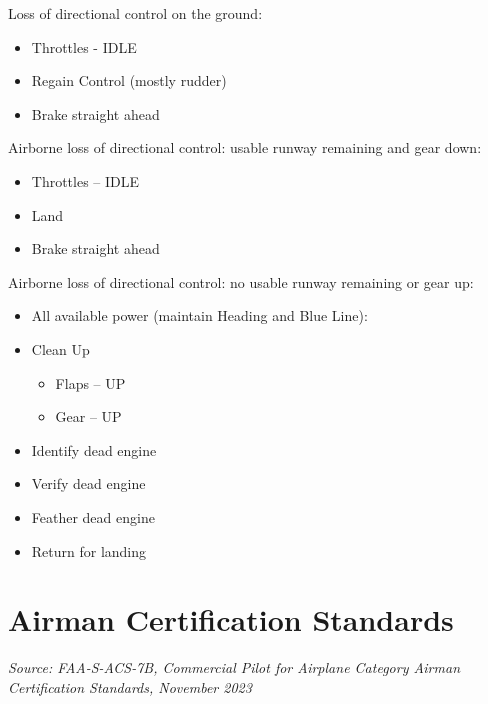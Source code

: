 \bfseries{

Loss of directional control on the ground:
\begin{itemize}
    \item Throttles - IDLE
    \item Regain Control (mostly rudder)
    \item Brake straight ahead
\end{itemize}

Airborne loss of directional control: usable runway remaining and gear down:
\begin{itemize}
    \item Throttles – IDLE
    \item Land
    \item Brake straight ahead
\end{itemize}

Airborne loss of directional control: no usable runway remaining or gear up:
\begin{itemize}
    \item All available power (maintain Heading and Blue Line):
    \item Clean Up
        \begin{itemize}
            \item[\ding{226}] Flaps – UP
            \item[\ding{226}] Gear – UP
        \end{itemize}
    \item Identify dead engine
    \item Verify dead engine
    \item Feather dead engine
    \item Return for landing
\end{itemize}

\section{Airman Certification Standards}

\emph{Source: FAA-S-ACS-7B, Commercial Pilot for Airplane Category
Airman Certification Standards, November 2023} 


}
